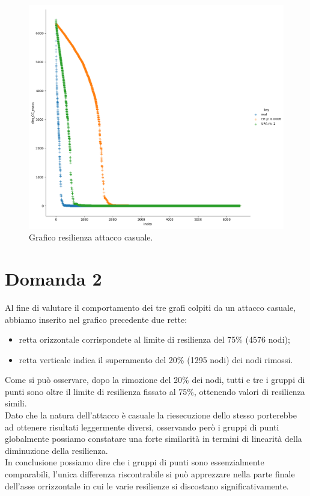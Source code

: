 \documentclass{article}
\begin{document}
\begin{landscape}
	\begin{figure}
		\centering
		\includegraphics[width=1.3\textwidth]{figures/figure_maxdegree}
		\caption{Grafico resilienza attacco casuale.}
	\end{figure}
\end{landscape}

\newpage
\section*{Domanda 2}
Al fine di valutare il comportamento dei tre grafi colpiti da un attacco casuale, abbiamo inserito nel grafico precedente due rette:
\begin{itemize}
	\item retta orizzontale corrispondete al limite di resilienza del 75\% (4576 nodi);
	\item retta verticale indica il superamento del 20\% (1295 nodi) dei nodi rimossi. 
\end{itemize}
Come si può osservare, dopo la rimozione del 20\% dei nodi, tutti e tre i gruppi di punti sono oltre il limite di resilienza fissato al 75\%, ottenendo valori di resilienza simili.\\
Dato che la natura dell'attacco è casuale la riesecuzione dello stesso porterebbe ad ottenere risultati leggermente diversi, osservando però i gruppi di punti globalmente possiamo constatare una forte similarità in termini di linearità della diminuzione della resilienza.\\
In conclusione possiamo dire che i gruppi di punti sono essenzialmente comparabili, l'unica differenza riscontrabile si può apprezzare nella parte finale dell'asse orrizzontale in cui le varie resilienze si discostano significativamente.
\end{document}
